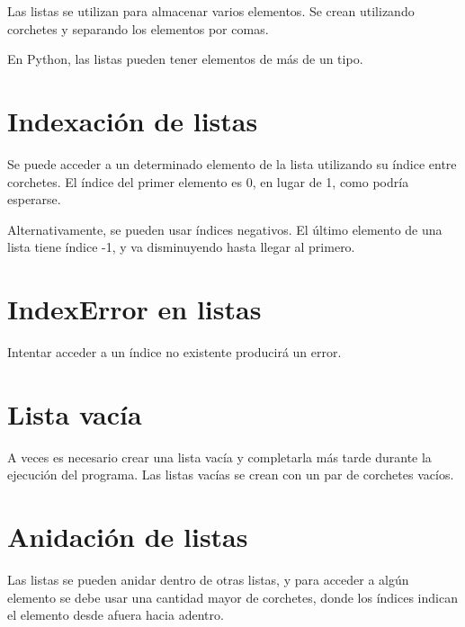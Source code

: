 \documentclass{report}
\begin{document}
Las listas se utilizan para almacenar varios elementos. Se crean utilizando corchetes y separando los elementos por comas.


En Python, las listas pueden tener elementos de más de un tipo.


\section{Indexación de listas}

Se puede acceder a un determinado elemento de la lista utilizando su índice entre corchetes. El índice del primer elemento es 0, en lugar de 1, como podría esperarse.


Alternativamente, se pueden usar índices negativos. El último elemento de una lista tiene índice -1, y va disminuyendo hasta llegar al primero.


\section{IndexError en listas}

Intentar acceder a un índice no existente producirá un error.


\section{Lista vacía}

A veces es necesario crear una lista vacía y completarla más tarde durante la ejecución del programa. Las listas vacías se crean con un par de corchetes vacíos.


\section{Anidación de listas}

Las listas se pueden anidar dentro de otras listas, y para acceder a algún elemento se debe usar una cantidad mayor de corchetes, donde los índices indican el elemento desde afuera hacia adentro.
\end{document}
